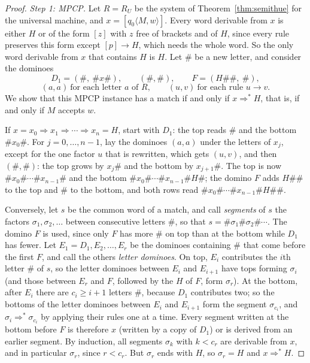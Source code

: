\begin{proof}
\emph{Step 1: MPCP.} Let $R=R_U$ be the system of Theorem~\ref{thm:semithue} for the universal machine, and $x=[q_0\langle M,w\rangle]$. Every word derivable from $x$ is either $H$ or of the form $[z]$ with $z$ free of brackets and of $H$, since every rule preserves this form except $[p]\to H$, which needs the whole word. So the only word derivable from $x$ that contains $H$ is $H$. Let $\#$ be a new letter, and consider the dominoes
\[
D_1=(\#,\ \#x\#),\qquad (\#,\#),\qquad F=(H\#\#,\ \#),
\]
\[
(a,a)\ \text{for each letter }a\text{ of }R,\qquad (u,v)\ \text{for each rule }u\to v.
\]
We show that this MPCP instance has a match if and only if $x\Rightarrow^*H$, that is, if and only if $M$ accepts $w$.

If $x=x_0\Rightarrow x_1\Rightarrow\cdots\Rightarrow x_n=H$, start with $D_1$: the top reads $\#$ and the bottom $\#x_0\#$. For $j=0,\dots,n-1$, lay the dominoes $(a,a)$ under the letters of $x_j$, except for the one factor $u$ that is rewritten, which gets $(u,v)$, and then $(\#,\#)$: the top grows by $x_j\#$ and the bottom by $x_{j+1}\#$. The top is now $\#x_0\#\cdots\#x_{n-1}\#$ and the bottom $\#x_0\#\cdots\#x_{n-1}\#H\#$; the domino $F$ adds $H\#\#$ to the top and $\#$ to the bottom, and both rows read $\#x_0\#\cdots\#x_{n-1}\#H\#\#$.

Conversely, let $s$ be the common word of a match, and call \emph{segments} of $s$ the factors $\sigma_1,\sigma_2,\dots$ between consecutive letters $\#$, so that $s=\#\sigma_1\#\sigma_2\#\cdots$. The domino $F$ is used, since only $F$ has more $\#$ on top than at the bottom while $D_1$ has fewer. Let $E_1=D_1,E_2,\dots,E_r$ be the dominoes containing $\#$ that come before the first $F$, and call the others \emph{letter dominoes}. On top, $E_i$ contributes the $i$th letter $\#$ of $s$, so the letter dominoes between $E_i$ and $E_{i+1}$ have tops forming $\sigma_i$ (and those between $E_r$ and $F$, followed by the $H$ of $F$, form $\sigma_r$). At the bottom, after $E_i$ there are $c_i\ge i+1$ letters $\#$, because $D_1$ contributes two; so the bottoms of the letter dominoes between $E_i$ and $E_{i+1}$ form the segment $\sigma_{c_i}$, and $\sigma_i\Rightarrow^*\sigma_{c_i}$ by applying their rules one at a time. Every segment written at the bottom before $F$ is therefore $x$ (written by a copy of $D_1$) or is derived from an earlier segment. By induction, all segments $\sigma_k$ with $k<c_r$ are derivable from $x$, and in particular $\sigma_r$, since $r<c_r$. But $\sigma_r$ ends with $H$, so $\sigma_r=H$ and $x\Rightarrow^*H$.


\end{proof}
